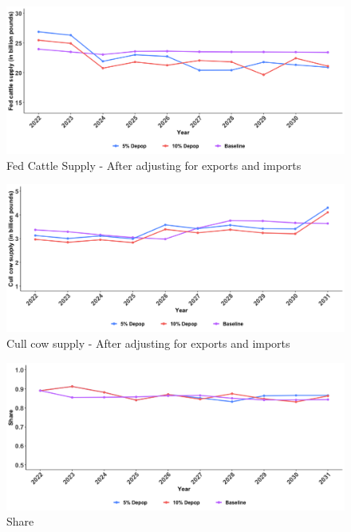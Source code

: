 \documentclass[
]{article}
\begin{document}
\begin{figure}
  \includegraphics[width=1.1\linewidth]{FMD-SimulationPlots/09-02/SlSupplyOPTDOM.png}
  \caption{Fed Cattle Supply - After adjusting for exports and imports}
\end{figure}

\begin{figure}
  \includegraphics[width=1.1\linewidth]{FMD-SimulationPlots/09-02/ClSupplyOPTDOM.png}
  \caption{Cull cow supply - After adjusting for exports and imports}
\end{figure}

\begin{figure}
  \includegraphics[width=1.1\linewidth]{FMD-SimulationPlots/09-02/ShareOPT.png}
  \caption{Share}
\end{figure}
\end{document}
